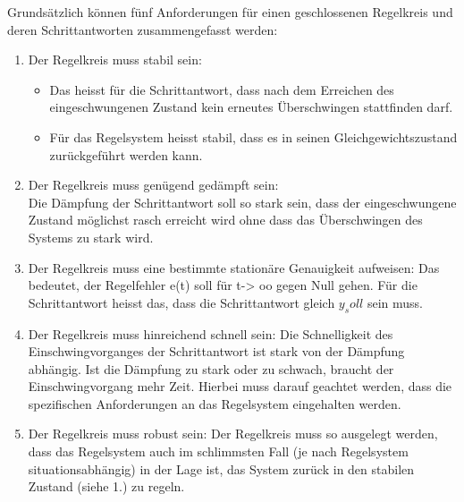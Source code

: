 Grunds\"atzlich  k\"onnen  f\"unf   Anforderungen  f\"ur  einen  geschlossenen
Regelkreis und deren Schrittantworten zusammengefasst werden:\\
\begin{enumerate}
    \item Der Regelkreis muss stabil sein:
        \begin{itemize}
            \item
                Das heisst  f\"ur die Schrittantwort, dass  nach dem Erreichen
                des  eingeschwungenen  Zustand kein  erneutes  \"Uberschwingen
                stattfinden darf.
            \item
                F\"ur  das  Regelsystem  heisst  stabil,  dass  es  in  seinen
                Gleichgewichtszustand zur\"uckgef\"uhrt werden kann.
        \end{itemize}
    \item
        Der Regelkreis  muss gen\"ugend ged\"ampft sein: \\Die  D\"ampfung der
        Schrittantwort soll  so stark  sein, dass der  eingeschwungene Zustand
        m\"oglichst  rasch erreicht  wird  ohne dass  das \"Uberschwingen  des
        Systems zu stark wird.
    \item
        Der   Regelkreis   muss   eine  bestimmte   station\"are   Genauigkeit
        aufweisen: Das  bedeutet,  der  Regelfehler  e(t) soll  f\"ur  t->  oo
        gegen  Null  gehen. F\"ur  die  Schrittantwort heisst  das,  dass  die
        Schrittantwort gleich $y_soll$ sein muss.
    \item
        Der Regelkreis  muss hinreichend  schnell sein: Die  Schnelligkeit des
        Einschwingvorganges der  Schrittantwort ist  stark von  der D\"ampfung
        abh\"angig. Ist die D\"ampfung  zu stark oder zu  schwach, braucht der
        Einschwingvorgang mehr Zeit. Hierbei muss darauf geachtet werden, dass
        die spezifischen Anforderungen an das Regelsystem eingehalten werden.
    \item
        Der  Regelkreis muss  robust  sein: Der Regelkreis  muss so  ausgelegt
        werden,  dass  das  Regelsystem  auch im  schlimmsten  Fall  (je  nach
        Regelsystem situationsabh\"angig) in der Lage ist, das System zur\"uck
        in den stabilen Zustand (siehe 1.) zu regeln.
\end{enumerate}

